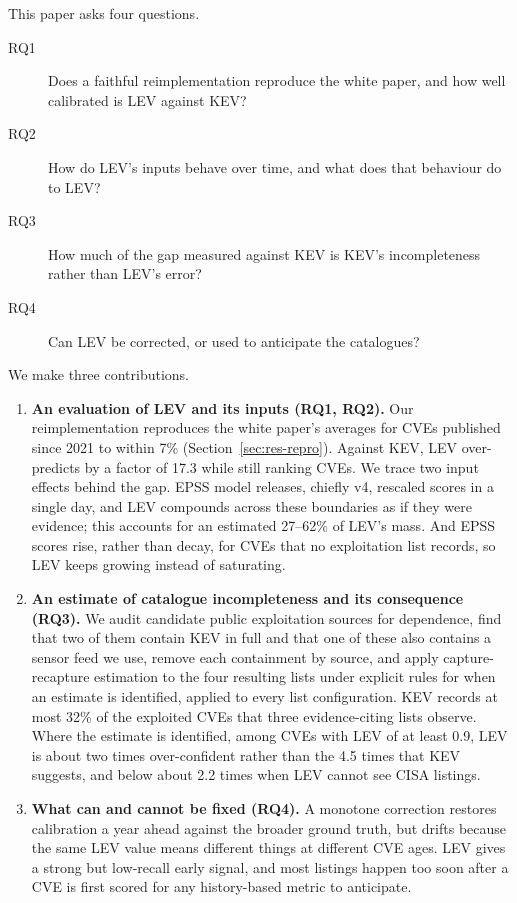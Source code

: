 This paper asks four questions.
\begin{description}
\item[RQ1] Does a faithful reimplementation reproduce the white paper, and how
well calibrated is LEV against KEV?
\item[RQ2] How do LEV's inputs behave over time, and what does that behaviour
do to LEV?
\item[RQ3] How much of the gap measured against KEV is KEV's incompleteness
rather than LEV's error?
\item[RQ4] Can LEV be corrected, or used to anticipate the catalogues?
\end{description}

\noindent We make three contributions.
\begin{enumerate}
\item \textbf{An evaluation of LEV and its inputs (RQ1, RQ2).} Our
reimplementation reproduces the white paper's averages for CVEs published since
2021 to within 7\% (Section~\ref{sec:res-repro}). Against KEV, LEV over-predicts by a factor of 17.3 while still ranking
CVEs. We trace two input effects behind the gap. EPSS model releases, chiefly v4,
rescaled scores in a single day, and LEV compounds across these boundaries as
if they were evidence; this accounts for an estimated 27--62\% of LEV's mass.
And EPSS scores rise, rather than decay, for CVEs that no exploitation list
records, so LEV keeps growing instead of saturating.
\item \textbf{An estimate of catalogue incompleteness and its consequence
(RQ3).} We audit candidate public exploitation sources for dependence, find that two
of them contain KEV in full and that one of these also contains a sensor feed
we use, remove each containment by source, and apply capture-recapture
estimation to the four resulting lists under explicit rules for when an estimate is
identified, applied to every list configuration. KEV records at most 32\% of the exploited CVEs that
three evidence-citing lists observe. Where the estimate is identified, among
CVEs with LEV of at least 0.9, LEV is about two times over-confident rather
than the 4.5 times that KEV suggests, and below about 2.2 times when LEV cannot
see CISA listings.
\item \textbf{What can and cannot be fixed (RQ4).} A monotone correction
restores calibration a year ahead against the broader ground truth, but drifts
because the same LEV value means different things at different CVE ages. LEV gives
a strong but low-recall early signal, and most listings happen too soon after
a CVE is first scored for any history-based metric to anticipate.
\end{enumerate}

